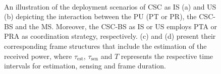 \documentclass[draftcls, onecolumn, 11pt]{IEEEtran}
\newcommand{\sub}[1]{_{\text{#1}}}
\newcommand{\test}{\tau\sub{est}}
\newcommand{\tsen}{\tau\sub{sen}}
\begin{document}
\begin{figure}[!t]
\centering
{} 
\hfil
{} \\
\hfil
{} 
\caption{An illustration of the deployment scenarios of CSC as IS (a) and US (b) depicting the interaction between the PU (PT or PR), the CSC-BS and the MS. Moreover, the CSC-BS as IS or US employs PTA or PRA as coordination strategy, respectively. (c) and (d) present their corresponding frame structures that include the estimation of the received power, where $\test$, $\tsen$ and $T$ represents the respective time intervals for estimation, sensing and frame duration.}
\label{fig:CSC_R}
\end{figure}
\end{document}
